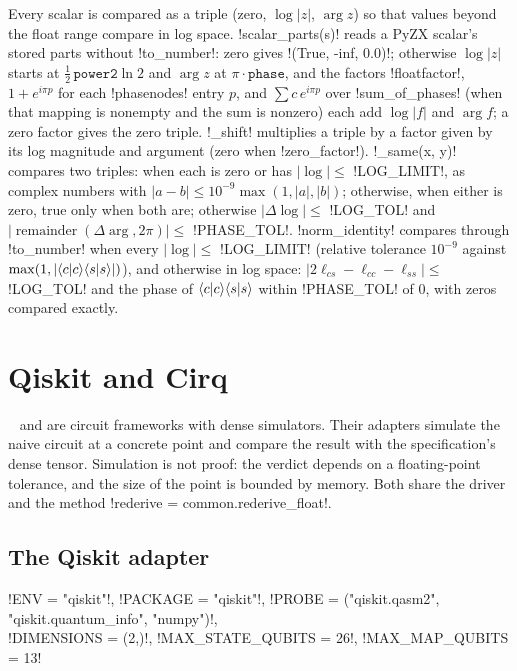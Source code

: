 Every scalar is compared as a triple (zero, $\log|z|$, $\arg z$) so that values beyond the float range compare in log space. \py!scalar_parts(s)! reads a PyZX scalar's stored parts without \code!to_number!: zero gives \py!(True, -inf, 0.0)!; otherwise $\log|z|$ starts at $\tfrac12\,\mathtt{power2}\ln2$ and $\arg z$ at $\pi\cdot\mathtt{phase}$, and the factors \code!floatfactor!, $1+e^{i\pi p}$ for each \code!phasenodes! entry $p$, and $\sum c\,e^{i\pi p}$ over \code!sum_of_phases! (when that mapping is nonempty and the sum is nonzero) each add $\log|f|$ and $\arg f$; a zero factor gives the zero triple. \py!_shift! multiplies a triple by a factor given by its log magnitude and argument (zero when \py!zero_factor!). \py!_same(x, y)! compares two triples: when each is zero or has $|\log|\leq$ \py!LOG_LIMIT!, as complex numbers with $|a-b|\leq10^{-9}\max(1,|a|,|b|)$; otherwise, when either is zero, true only when both are; otherwise $|\Delta\log|\leq$ \py!LOG_TOL! and $|\operatorname{remainder}(\Delta\arg,2\pi)|\leq$ \py!PHASE_TOL!. \py!norm_identity! compares through \code!to_number! when every $|\log|\leq$ \py!LOG_LIMIT! (relative tolerance $10^{-9}$ against $\max(1,|\langle c \vert c \rangle\langle s \vert s \rangle|)$), and otherwise in log space: $|2\ell_{cs}-\ell_{cc}-\ell_{ss}|\leq$ \py!LOG_TOL! and the phase of $\langle c \vert c \rangle\langle s \vert s \rangle$ within \py!PHASE_TOL! of $0$, with zeros compared exactly.

\section{Qiskit and Cirq}\label{sec:bench-tools-qiskit}

~\cite{javadi2024qiskit} and  are circuit frameworks with dense simulators. Their adapters simulate the naive circuit at a concrete point and compare the result with the specification's dense tensor. Simulation is not proof: the verdict depends on a floating-point tolerance, and the size of the point is bounded by memory. Both share the driver  and the method \py!rederive = common.rederive_float!.

\subsection{The Qiskit adapter}

\begin{signature}
\py!ENV = "qiskit"!, \py!PACKAGE = "qiskit"!, \py!PROBE = ("qiskit.qasm2", "qiskit.quantum_info", "numpy")!,\\
\py!DIMENSIONS = (2,)!, \py!MAX_STATE_QUBITS = 26!, \py!MAX_MAP_QUBITS = 13!
\end{signature}

